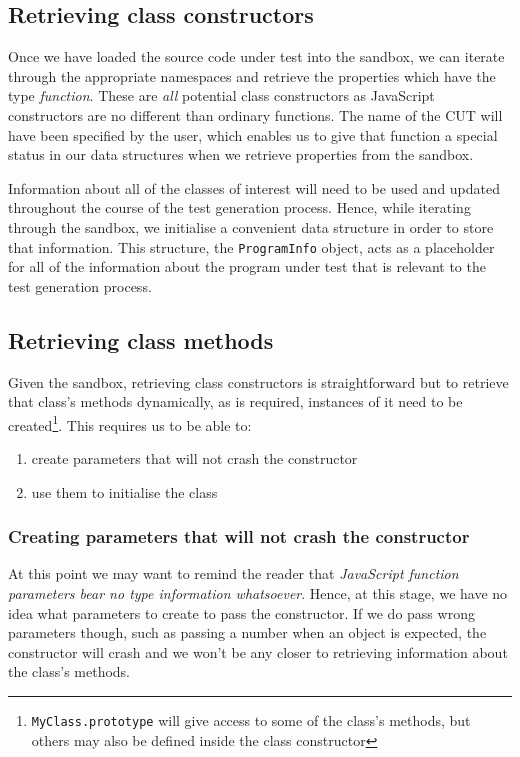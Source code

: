 \subsection{Retrieving class constructors}
Once we have loaded the source code under test into the sandbox, we can iterate through the appropriate namespaces and retrieve the properties which have the type \emph{function}. These are \emph{all} potential class constructors as JavaScript constructors are no different than ordinary functions. The name of the CUT will have been specified by the user, which enables us to give that function a special status in our data structures when we retrieve properties from the sandbox.

Information about all of the classes of interest will need to be used and updated throughout the course of the test generation process. Hence, while iterating through the sandbox, we initialise a convenient data structure in order to store that information. This structure, the \texttt{ProgramInfo} object, acts as a placeholder for all of the information about the program under test that is relevant to the test generation process.

\subsection{Retrieving class methods}
Given the sandbox, retrieving class constructors is straightforward but to retrieve that class's methods dynamically, as is required, instances of it need to be created\footnote{\texttt{MyClass.prototype} will give access to some of the class's methods, but others may also be defined inside the class constructor}. This requires us to be able to:

\begin{enumerate}
   \item create parameters that will not crash the constructor
   \item use them to initialise the class
\end{enumerate}

\subsubsection{Creating parameters that will not crash the constructor}
At this point we may want to remind the reader that \emph{JavaScript function parameters bear no type information whatsoever}. Hence, at this stage, we have no idea what parameters to create to pass the constructor. If we do pass wrong parameters though, such as passing a number when an object is expected, the constructor will crash and we won't be any closer to retrieving information about the class's methods.

